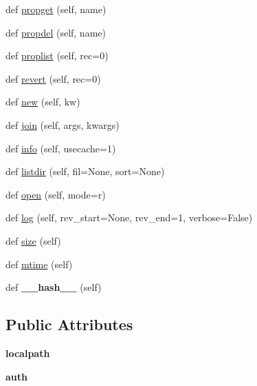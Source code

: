 \begin{DoxyCompactItemize}
\item 
def \hyperlink{classpy_1_1__path_1_1svnwc_1_1_svn_w_c_command_path_a3b0c3b6b60d69ccb962112319e5f283d}{propget} (self, name)
\item 
def \hyperlink{classpy_1_1__path_1_1svnwc_1_1_svn_w_c_command_path_af89cd5b7ae42106ef1d683683a3dafee}{propdel} (self, name)
\item 
def \hyperlink{classpy_1_1__path_1_1svnwc_1_1_svn_w_c_command_path_a789219ad907fb18c3cc9b8f70d0642ff}{proplist} (self, rec=0)
\item 
def \hyperlink{classpy_1_1__path_1_1svnwc_1_1_svn_w_c_command_path_ac380ebfdcfa150a8a2d8ad6133b810c2}{revert} (self, rec=0)
\item 
def \hyperlink{classpy_1_1__path_1_1svnwc_1_1_svn_w_c_command_path_a1441149ff9d5a967f9342bdf7872f873}{new} (self, kw)
\item 
def \hyperlink{classpy_1_1__path_1_1svnwc_1_1_svn_w_c_command_path_a3028b477c4a26fc0c9142ce71ac624bf}{join} (self, args, kwargs)
\item 
def \hyperlink{classpy_1_1__path_1_1svnwc_1_1_svn_w_c_command_path_aac653743deaf83c5093442aaae5707d6}{info} (self, usecache=1)
\item 
def \hyperlink{classpy_1_1__path_1_1svnwc_1_1_svn_w_c_command_path_aa00e57cdc51f59781a80a44afb1f843d}{listdir} (self, fil=None, sort=None)
\item 
def \hyperlink{classpy_1_1__path_1_1svnwc_1_1_svn_w_c_command_path_ae9211cd255788742355163db34ebe017}{open} (self, mode=\textquotesingle{}r\textquotesingle{})
\item 
def \hyperlink{classpy_1_1__path_1_1svnwc_1_1_svn_w_c_command_path_a2a4b4c81cf18c4d6c4e5519282b7b0a0}{log} (self, rev\+\_\+start=None, rev\+\_\+end=1, verbose=False)
\item 
def \hyperlink{classpy_1_1__path_1_1svnwc_1_1_svn_w_c_command_path_adcc55a67721ce4c4a01440e3fc39281c}{size} (self)
\item 
def \hyperlink{classpy_1_1__path_1_1svnwc_1_1_svn_w_c_command_path_aded930558e7fc8b740663747314714d1}{mtime} (self)
\item 
\mbox{\label{classpy_1_1__path_1_1svnwc_1_1_svn_w_c_command_path_a71f3d1ceaac2abc41eef6afc5dbc8a05}} 
def {\bfseries \+\_\+\+\_\+hash\+\_\+\+\_\+} (self)
\end{DoxyCompactItemize}
\subsection*{Public Attributes}
\begin{DoxyCompactItemize}
\item 
\mbox{\label{classpy_1_1__path_1_1svnwc_1_1_svn_w_c_command_path_a216c671cf101302f4253cf5ea003a048}} 
{\bfseries localpath}
\item 
\mbox{\label{classpy_1_1__path_1_1svnwc_1_1_svn_w_c_command_path_a72fcaf1386792fca60bac7b3654846c0}} 
{\bfseries auth}
\end{DoxyCompactItemize}
